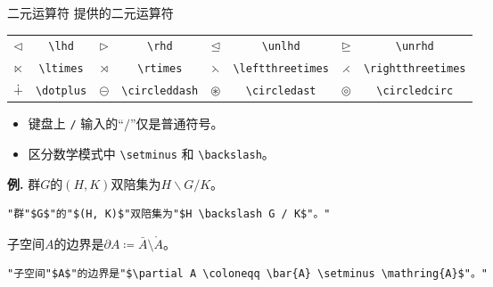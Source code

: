 \documentclass[mathserif]{beamer}
\newcommand{\codegreen}[1]{\textcolor{codegreen}{#1}}
\newenvironment{instance}{\zihao{-5}\textbf{\songti \codegreen{例.}}}{\hfill\par}
\begin{document}
\begin{frame}[fragile]{二元运算符}{\AmS{} 提供的二元运算符}
\begin{table}[H]
\centering
\begin{tabular}{cc|cc|cc|cc}
	\toprule
	$\lhd$ & \lstinline'\lhd' & $\rhd$ & \lstinline'\rhd' & $\unlhd$ & \lstinline'\unlhd' & $\unrhd$ & \lstinline'\unrhd' \\
	$\ltimes$ & \lstinline'\ltimes' & $\rtimes$ & \lstinline'\rtimes' & $\leftthreetimes$ & \lstinline'\leftthreetimes' & $\rightthreetimes$ & \lstinline'\rightthreetimes' \\
	$\dotplus$ & \lstinline'\dotplus' & $\circleddash$ & \lstinline'\circleddash' & $\circledast$ & \lstinline'\circledast' & $\circledcirc$ & \lstinline'\circledcirc' \\
	\bottomrule
\end{tabular}
\end{table}
\begin{itemize}

\item 键盘上 \lstinline'/' 输入的``$/$''仅是普通符号。

\item 区分数学模式中 \lstinline'\setminus' 和 \lstinline'\backslash'。

\end{itemize}
\begin{instance}
	群$G$的$(H, K)$双陪集为$H \backslash G / K$。
\begin{lstlisting}[numbers=none]
	"群"$G$"的"$(H, K)$"双陪集为"$H \backslash G / K$"。"
\end{lstlisting}
子空间$A$的边界是$\partial A \coloneqq \bar{A} \setminus \mathring{A}$。
\begin{lstlisting}[numbers=none]
	"子空间"$A$"的边界是"$\partial A \coloneqq \bar{A} \setminus \mathring{A}$"。"
\end{lstlisting}
\end{instance}
\end{frame}
\end{document}
